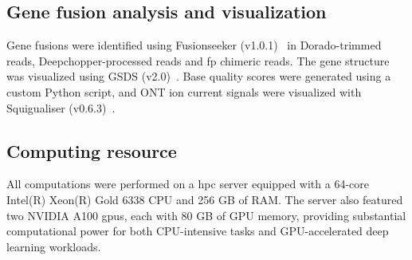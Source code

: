\documentclass[pdflatex,sn-nature, lineno]{sn-jnl}%
\theoremstyle{thmstyleone}%
\theoremstyle{thmstyletwo}%
\theoremstyle{thmstylethree}%
\begin{document}
\subsection{Gene fusion analysis and visualization}

Gene fusions were identified using Fusionseeker (v1.0.1)~\cite{chen2023gene} in Dorado-trimmed reads, Deepchopper-processed reads and \gls{fp} chimeric reads.
The gene structure was visualized using GSDS (v2.0)~\cite{hu2015gsds}.
Base quality scores were generated using a custom Python script, and ONT ion current signals were visualized with Squigualiser (v0.6.3)~\cite{samarakoon2024interactive}.


\subsection{Computing resource}

All computations were performed on a \gls{hpc} server equipped with a 64-core Intel(R) Xeon(R) Gold 6338 CPU and 256 GB of RAM.
The server also featured two NVIDIA A100 \glspl{gpu}, each with 80 GB of GPU memory, providing substantial computational power for both CPU-intensive tasks and GPU-accelerated deep learning workloads.





\end{document}
